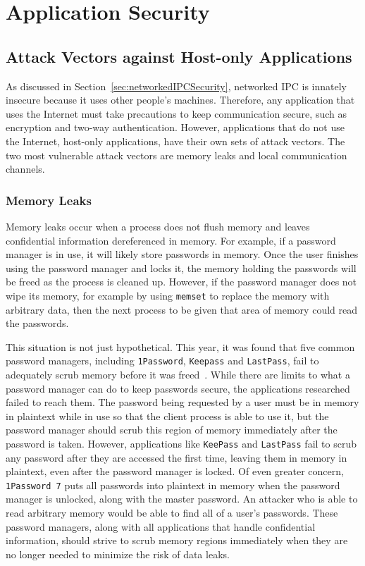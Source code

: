 \chapter{Application Security}
\label{sec:securityOfIPC}

\section{Attack Vectors against Host-only Applications}
\label{sec:hostOnlyAttackVectors}
As discussed in Section~\ref{sec:networkedIPCSecurity}, networked IPC is innately insecure because it uses other people's machines.  Therefore, any application that uses the Internet must take precautions to keep communication secure, such as encryption and two-way authentication.  However, applications that do not use the Internet, host-only applications, have their own sets of attack vectors.  The two most vulnerable attack vectors are memory leaks and local communication channels.

\subsection{Memory Leaks}
\label{sec:memoryLeaks}
Memory leaks occur when a process does not flush memory and leaves confidential information dereferenced in memory.  For example, if a password manager is in use, it will likely store passwords in memory.  Once the user finishes using the password manager and locks it, the memory holding the passwords will be freed as the process is cleaned up.  However, if the password manager does not wipe its memory, for example by using \texttt{memset} to replace the memory with arbitrary data, then the next process to be given that area of memory could read the passwords.

This situation is not just hypothetical.  This year, it was found that five common password managers, including \texttt{1Password}, \texttt{Keepass} and \texttt{LastPass}, fail to adequately scrub memory before it was freed~\cite{independent_security_evaluators_2019}.  While there are limits to what a password manager can do to keep passwords secure, the applications researched failed to reach them.  The password being requested by a user must be in memory in plaintext while in use so that the client process is able to use it, but the password manager should scrub this region of memory immediately after the password is taken.  However, applications like \texttt{KeePass} and \texttt{LastPass} fail to scrub any password after they are accessed the first time, leaving them in memory in plaintext, even after the password manager is locked.  Of even greater concern, \texttt{1Password 7} puts all passwords into plaintext in memory when the password manager is unlocked, along with the master password.  An attacker who is able to read arbitrary memory would be able to find all of a user's passwords.  These password managers, along with all applications that handle confidential information, should strive to scrub memory regions immediately when they are no longer needed to minimize the risk of data leaks.

